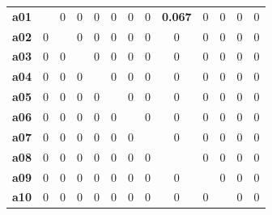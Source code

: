 \documentclass[final,3p,times,twocolumn]{elsarticle}
\begin{document}
\begin{table}[h]
{{\begin{tabular}{c|c|c|c|c|c|c|c|c|c|c|c|c|}
				\hhline{~------------}
			 {\bf a01} &     \color{white}{\bf 0.933}\cellcolor[gray]{.1}  &          0 &          0 &          0 &          0 &          0 &          0 &     {\bf 0.067}\cellcolor[gray]{.9}  &          0 &          0 &          0 &          0 \\
				\hhline{~------------}
			 {\bf a02} &          0 &       \color{white}{\bf 1.0}\cellcolor[gray]{.0}  &          0 &          0 &          0 &          0 &          0 &          0 &          0 &          0 &          0 &          0 \\
				\hhline{~------------}
			 {\bf a03} &          0 &          0 &       \color{white}{\bf 1.0}\cellcolor[gray]{.0}  &          0 &          0 &          0 &          0 &          0 &          0 &          0 &          0 &          0 \\
				\hhline{~------------}
			 {\bf a04} &          0 &          0 &          0 &       \color{white}{\bf 1.0}\cellcolor[gray]{.0}  &          0 &          0 &          0 &          0 &          0 &          0 &          0 &          0 \\
				\hhline{~------------}
			 {\bf a05} &          0 &          0 &          0 &          0 &       \color{white}{\bf 1.0}\cellcolor[gray]{.0}  &          0 &          0 &          0 &          0 &          0 &          0 &          0 \\
				\hhline{~------------}
			 {\bf a06} &          0 &          0 &          0 &          0 &          0 &       \color{white}{\bf 1.0}\cellcolor[gray]{.0}  &          0 &          0 &          0 &          0 &          0 &          0 \\
				\hhline{~------------}
			 {\bf a07} &          0 &          0 &          0 &          0 &          0 &          0 &       \color{white}{\bf 1.0}\cellcolor[gray]{.0}  &          0 &          0 &          0 &          0 &          0 \\
				\hhline{~------------}
			 {\bf a08} &          0 &          0 &          0 &          0 &          0 &          0 &          0 &       \color{white}{\bf 1.0}\cellcolor[gray]{.0}  &          0 &          0 &          0 &          0 \\
				\hhline{~------------}
			 {\bf a09} &          0 &          0 &          0 &          0 &          0 &          0 &          0 &          0 &       \color{white}{\bf 1.0}\cellcolor[gray]{.0}  &          0 &          0 &          0 \\
				\hhline{~------------}
			 {\bf a10} &          0 &          0 &          0 &          0 &          0 &          0 &          0 &          0 &          0 &       \color{white}{\bf 1.0}\cellcolor[gray]{.0}  &          0 &          0 \\

\end{tabular}}}
\end{table}
\end{document}
